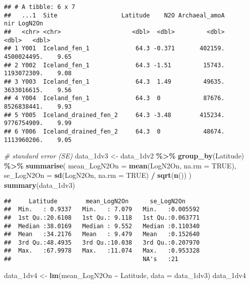 \documentclass[
]{article}
\newenvironment{Shaded}{\begin{snugshade}}{\end{snugshade}}
\newcommand{\AttributeTok}[1]{\textcolor[rgb]{0.13,0.29,0.53}{#1}}
\newcommand{\CommentTok}[1]{\textcolor[rgb]{0.56,0.35,0.01}{\textit{#1}}}
\newcommand{\ConstantTok}[1]{\textcolor[rgb]{0.56,0.35,0.01}{#1}}
\newcommand{\FunctionTok}[1]{\textcolor[rgb]{0.13,0.29,0.53}{\textbf{#1}}}
\newcommand{\NormalTok}[1]{#1}
\newcommand{\OtherTok}[1]{\textcolor[rgb]{0.56,0.35,0.01}{#1}}
\newcommand{\SpecialCharTok}[1]{\textcolor[rgb]{0.81,0.36,0.00}{\textbf{#1}}}
\begin{document}
\begin{verbatim}
## # A tibble: 6 x 7
##   ...1  Site                  Latitude    N2O Archaeal_amoA         nir LogN2On
##   <chr> <chr>                    <dbl>  <dbl>         <dbl>       <dbl>   <dbl>
## 1 Y001  Iceland_fen_1             64.3 -0.371       402159. 4500024495.    9.65
## 2 Y002  Iceland_fen_1             64.3 -1.51         15743. 1193072309.    9.08
## 3 Y003  Iceland_fen_1             64.3  1.49         49635. 3633016615.    9.56
## 4 Y004  Iceland_fen_1             64.3  0            87676. 8526838441.    9.93
## 5 Y005  Iceland_drained_fen_2     64.3 -3.48        415234. 9776754909.    9.99
## 6 Y006  Iceland_drained_fen_2     64.3  0            48674. 1113960206.    9.05
\end{verbatim}

\begin{Shaded}
\begin{Highlighting}[]
\CommentTok{\# standard error (SE) }
\NormalTok{data\_1dv3 }\OtherTok{\textless{}{-}}\NormalTok{ data\_1dv2 }\SpecialCharTok{\%\textgreater{}\%}
  \FunctionTok{group\_by}\NormalTok{(Latitude) }\SpecialCharTok{\%\textgreater{}\%}
  \FunctionTok{summarise}\NormalTok{(}
    \AttributeTok{mean\_LogN2On =} \FunctionTok{mean}\NormalTok{(LogN2On, }\AttributeTok{na.rm =} \ConstantTok{TRUE}\NormalTok{),}
    \AttributeTok{se\_LogN2On =} \FunctionTok{sd}\NormalTok{(LogN2On, }\AttributeTok{na.rm =} \ConstantTok{TRUE}\NormalTok{) }\SpecialCharTok{/} \FunctionTok{sqrt}\NormalTok{(}\FunctionTok{n}\NormalTok{())}
\NormalTok{  )}
\FunctionTok{summary}\NormalTok{(data\_1dv3)}
\end{Highlighting}
\end{Shaded}

\begin{verbatim}
##     Latitude        mean_LogN2On      se_LogN2On      
##  Min.   : 0.9337   Min.   : 7.079   Min.   :0.005592  
##  1st Qu.:20.6108   1st Qu.: 9.118   1st Qu.:0.063771  
##  Median :38.0169   Median : 9.552   Median :0.110340  
##  Mean   :34.2176   Mean   : 9.479   Mean   :0.152640  
##  3rd Qu.:48.4935   3rd Qu.:10.038   3rd Qu.:0.207970  
##  Max.   :67.9978   Max.   :11.074   Max.   :0.953328  
##                                     NA's   :21
\end{verbatim}

\begin{Shaded}
\begin{Highlighting}[]
\NormalTok{data\_1dv4 }\OtherTok{\textless{}{-}} \FunctionTok{lm}\NormalTok{(mean\_LogN2On }\SpecialCharTok{\textasciitilde{}}\NormalTok{ Latitude, }\AttributeTok{data =}\NormalTok{ data\_1dv3)}
\NormalTok{data\_1dv4}
\end{Highlighting}
\end{Shaded}
\end{document}
